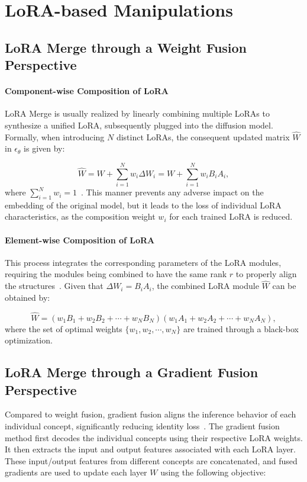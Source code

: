 \section{LoRA-based Manipulations}
\subsection{LoRA Merge through a Weight Fusion Perspective}
\paragraph{Component-wise Composition of LoRA}
LoRA Merge is usually realized by linearly combining multiple LoRAs to synthesize a unified LoRA, subsequently plugged into the diffusion model. Formally, when introducing $N$ distinct LoRAs, the consequent updated matrix $\hat W$ in $\epsilon_{\theta}$ is given by:

\begin{equation}
    \hat{W} = W+\sum^{N}_{i=1}w_{i}\Delta W_{i} = W+\sum^{N}_{i=1}w_{i}B_{i}A_{i},
    \label{lora merge2}
\end{equation}
where $\sum^{N}_{i=1}w_{i}=1$~\citep{loramerge}. This manner prevents any adverse impact on the embedding of the original model, but it leads to the loss of individual LoRA characteristics, as the composition weight $w_{i}$ for each trained LoRA is reduced.

\paragraph{Element-wise Composition of LoRA}
This process integrates the corresponding parameters of the LoRA modules, requiring the modules being combined to have the same rank $r$ to properly align the structures~\citep{lorahub}. Given that $\Delta W_{i} = B_{i}A_{i}$, the combined LoRA module $\hat{W}$ can be obtained by:

\begin{equation}
    \hat{W} = (w_{1}B_{1}+w_{2}B_{2}+\cdots+w_{N}B_{N})(w_{1}A_{1}+w_{2}A_{2}+\cdots+w_{N}A_{N}),
    \label{lora merge3}
\end{equation}
where the set of optimal weights $\{w_{1},w_{2},\cdots,w_{N}\}$ are trained through a black-box optimization.

\subsection{LoRA Merge through a Gradient Fusion Perspective}
Compared to weight fusion, gradient fusion aligns the inference behavior of each individual concept, significantly reducing identity loss~\citep{mixlora}. The gradient fusion method first decodes the individual concepts using their respective LoRA weights. It then extracts the input and output features associated with each LoRA layer. These input/output features from different concepts are concatenated, and fused gradients are used to update each layer $W$ using the following objective:

